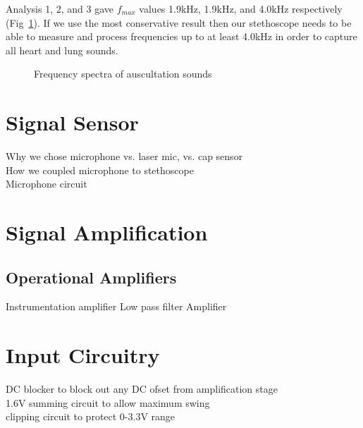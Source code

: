 Analysis 1, 2, and 3 gave $f_{max}$ values 1.9kHz, 1.9kHz, and 4.0kHz respectively (Fig~\ref{fig:ausc_spectra}). If we use the most conservative result then our stethoscope needs to be able to measure and process frequencies up to at least 4.0kHz in order to capture all heart and lung sounds.

\begin{figure}[htb]
	\centering
	\caption{Frequency spectra of auscultation sounds}
	\label{fig:ausc_spectra}
\end{figure}

\section{Signal Sensor}
Why we chose microphone vs. laser mic, vs. cap sensor \\
How we coupled microphone to stethoscope \\
Microphone circuit

\section{Signal Amplification}
\subsection{Operational Amplifiers}

Instrumentation amplifier \cite{Franco2015}
Low pass filter \cite[p.~279]{Horowitz1989}
Amplifier

\section{Input Circuitry}
DC blocker to block out any DC ofset from amplification stage\\
1.6V summing circuit to allow maximum swing\\
clipping circuit to protect 0-3.3V range \\

